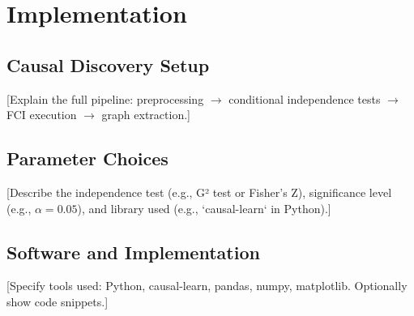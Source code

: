 \documentclass[main.tex]{subfiles}
\begin{document}
\section{Implementation}

\subsection{Causal Discovery Setup}
[Explain the full pipeline: preprocessing $\rightarrow$ conditional independence tests $\rightarrow$ FCI execution $\rightarrow$ graph extraction.]

\subsection{Parameter Choices}
[Describe the independence test (e.g., G² test or Fisher's Z), significance level (e.g., $\alpha = 0.05$), and library used (e.g., `causal-learn` in Python).]

\subsection{Software and Implementation}
[Specify tools used: Python, causal-learn, pandas, numpy, matplotlib. Optionally show code snippets.]
\end{document}
